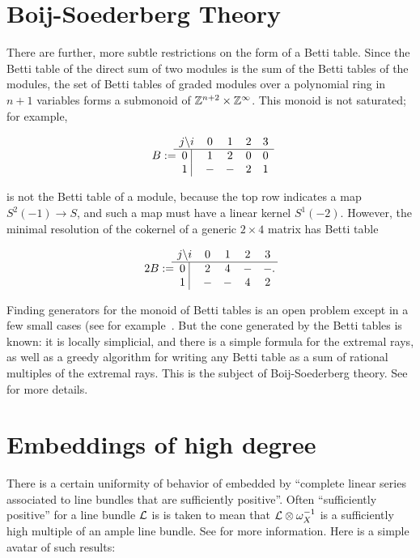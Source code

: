 \section{Boij-Soederberg Theory}
There are further, more subtle restrictions on the form of a Betti table. Since the Betti table of the direct sum of two modules is the sum of the Betti tables of the modules, 
the set of Betti tables of graded modules over a polynomial ring in $n+1$ variables forms a submonoid of 
${\mathbb Z}^{n+2} \times {\mathbb Z}^{\infty}$. This monoid is not saturated; for example, 
\begin{small}
$$
B := \begin{matrix}
j \backslash i &0&1&2&3\\ \hline
\text{0 }\vline &1&2&0&0\\
\text{1 }\vline &-&-&2&1\\
\end{matrix}
$$
\end{small}
is not the Betti table of a module, because the top row indicates a map $S^{2}(-1) \to S$, and such
a map must have a linear kernel $S^{1}(-2)$. However, the minimal resolution of the cokernel
of a generic $2\times 4$ matrix has Betti table
\begin{small}
$$
2B := \begin{matrix}
j \backslash i &0&1&2&3\\ \hline
\text{0 }\vline &2&4&-&-\\
\text{1 }\vline &-&-&4&2\\
\end{matrix}.
$$
\end{small}
Finding generators for the monoid of Betti tables is an open problem except in a few small cases (see for example~\cite{Erman-semigroup}. But the cone generated by the Betti tables is known: it is locally simplicial, and there is a simple formula for the extremal rays, as well as a greedy algorithm for writing any Betti table as a sum of rational multiples of the extremal rays. This is the subject of Boij-Soederberg theory. See~\cite{Eisenbud-Schreyer Betti numbers of graded modules and cohomology of vector bundles} for more details.

\section{Embeddings of high degree}

There is a certain uniformity of behavior of  embedded by ``complete linear series associated to line bundles that are sufficiently positive''. Often ``sufficiently positive'' for a line bundle ${\mathcal L}$ is is taken to mean that
${\mathcal L} \otimes \omega_{X}^{-1}$ is a sufficiently high multiple of an ample line bundle. See \cite{Lazarsfeld, Positivity} for more information. Here is a simple avatar of such results:

